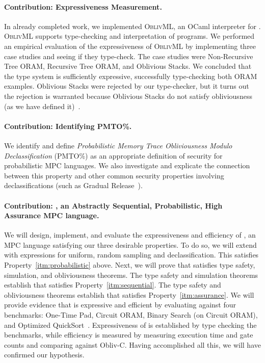 \paragraph{Contribution: \obliv Expressiveness Measurement.} In already completed work, we implemented \textsc{OblivML}, an OCaml
interpreter for \obliv. \textsc{OblivML} supports type-checking and interpretation of \obliv programs. We performed an empirical
evaluation of the expressiveness of \textsc{OblivML} by implementing three case studies and seeing if they type-check.
The case studies were Non-Recursive Tree ORAM, Recursive Tree ORAM, and Oblivious Stacks. We concluded that the type system is
sufficiently expressive, successfully type-checking both ORAM examples. Oblivious Stacks were rejected by our type-checker, but
it turns out the rejection is warranted because Oblivious Stacks do not satisfy obliviousness (as we have defined it)~\cite{todo}.

\paragraph{Contribution: Identifying PMTO\%.} We identify and define \emph{Probabilistic Memory Trace Obliviousness Modulo Declassification}
(PMTO\%) as an appropriate definition of security for probabilistic MPC languages. We also investigate and explicate the connection between
this property and other common security properties involving declassifications (such as Gradual Release~\cite{todo}).

\paragraph{Contribution: \lang, an \textbf{Abstractly Sequential}, \textbf{Probabilistic}, \textbf{High Assurance} MPC language.}
We will design, implement, and evaluate the expressiveness and efficiency of \lang, an MPC language satisfying our three desirable
properties. To do so, we will extend \mpc with expressions for uniform, random sampling and declassification. This satisfies
Property~\ref{itm:probabilistic} above. Next, we will prove that \lang satisfies type safety, simulation, and obliviousness theorems.
The type safety and simulation theorems establish that \lang satisfies Property~\ref{itm:sequential}. The type safety and obliviousness
theorems establish that \lang satisfies Property~\ref{itm:assurance}. We will provide evidence that \lang is expressive and efficient
by evaluating \lang against four benchmarks: One-Time Pad, Circuit ORAM, Binary Search (on Circuit ORAM), and Optimized QuickSort~\cite{}.
Expressiveness of \lang is established by type checking the benchmarks, while efficiency is measured by measuring execution time and
gate counts and comparing against Obliv-C. Having accomplished all this, we will have confirmed our hypothesis.


